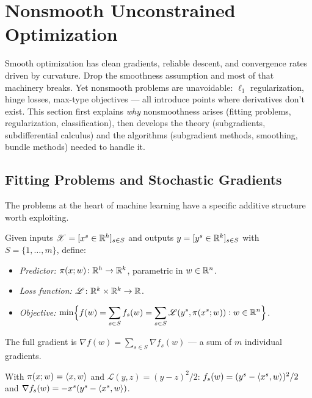 \section{Nonsmooth Unconstrained Optimization}\label{sec:nonsmooth}

Smooth optimization has clean gradients, reliable descent, and convergence rates driven by curvature.
Drop the smoothness assumption and most of that machinery breaks.
Yet nonsmooth problems are unavoidable: $\ell_1$ regularization, hinge losses, max-type objectives --- all introduce points where derivatives don't exist.
This section first explains \emph{why} nonsmoothness arises (fitting problems, regularization, classification), then develops the theory (subgradients, subdifferential calculus) and the algorithms (subgradient methods, smoothing, bundle methods) needed to handle it.


\subsection{Fitting Problems and Stochastic Gradients}\label{ssec:fitting}

The problems at the heart of machine learning have a specific additive structure worth exploiting.

\begin{defn}\label{def:fitting}
	Given inputs $\mathcal{X} = [x^s \in \mathbb{R}^h]_{s \in S}$ and outputs $y = [y^s \in \mathbb{R}^k]_{s \in S}$ with $S = \{1, \dots, m\}$, define:
	\begin{itemize}
		\item \textit{Predictor:} $\pi(x; w) \colon \mathbb{R}^h \to \mathbb{R}^k$, parametric in $w \in \mathbb{R}^n$.
		\item \textit{Loss function:} $\mathcal{L} \colon \mathbb{R}^k \times \mathbb{R}^k \to \mathbb{R}$.
		\item \textit{Objective:}
			$\displaystyle \min\Bigl\{f(w) = \sum_{s \in S} f_s(w) = \sum_{s \in S} \mathcal{L}(y^s, \pi(x^s; w)) : w \in \mathbb{R}^n\Bigr\}$.
	\end{itemize}
	The full gradient is $\nabla f(w) = \sum_{s \in S} \nabla f_s(w)$ --- a sum of $m$ individual gradients.
\end{defn}

\begin{exm}
	With $\pi(x; w) = \langle x, w\rangle$ and $\mathcal{L}(y, z) = (y - z)^2/2$:
	$f_s(w) = (y^s - \langle x^s, w\rangle)^2/2$ and $\nabla f_s(w) = -x^s(y^s - \langle x^s, w\rangle)$.
\end{exm}


